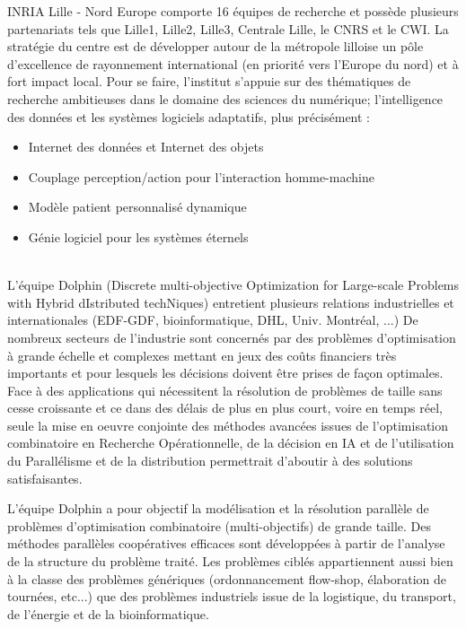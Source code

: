 \documentclass[a4paper,10pt]{report}
\begin{document}
      INRIA Lille - Nord Europe comporte 16 équipes de recherche et possède plusieurs partenariats tels que Lille1, Lille2, Lille3, Centrale Lille, le CNRS et le CWI.
      La stratégie du centre est de développer autour de la métropole lilloise un pôle d'excellence de rayonnement international (en priorité vers l'Europe du nord) et à fort impact local.
      Pour se faire, l'institut s'appuie sur des thématiques de recherche ambitieuses dans le domaine des sciences du numérique; l'intelligence des données et les systèmes logiciels adaptatifs, plus précisément :
      \begin{itemize} 
	\item Internet des données et Internet des objets
	\item Couplage perception/action pour l'interaction homme-machine
	\item Modèle patient personnalisé dynamique
	\item Génie logiciel pour les systèmes éternels
      \end{itemize}
      
      ~~\\
      
      L'équipe Dolphin (Discrete multi-objective Optimization for Large-scale Problems with Hybrid dIstributed techNiques) entretient plusieurs relations industrielles et internationales (EDF-GDF, bioinformatique, DHL, Univ. Montréal, ...)
      De nombreux secteurs de l'industrie sont concernés par des problèmes d'optimisation à grande échelle et complexes mettant en jeux des coûts financiers très importants et pour lesquels les décisions doivent être prises de façon optimales.
      Face à des applications qui nécessitent la résolution de problèmes de taille sans cesse croissante et ce dans des délais de plus en plus court, voire en temps réel, seule la mise en oeuvre conjointe des méthodes avancées issues de l'optimisation combinatoire en Recherche Opérationnelle, de la décision en IA et de l'utilisation du Parallélisme et de la distribution permettrait d'aboutir à des solutions satisfaisantes.

      L'équipe Dolphin a pour objectif la modélisation et la résolution parallèle de problèmes d'optimisation combinatoire (multi-objectifs) de grande taille. Des méthodes parallèles coopératives efficaces sont développées à partir de l'analyse de la structure du problème traité. Les problèmes ciblés appartiennent aussi bien à la classe des problèmes génériques (ordonnancement flow-shop, élaboration de tournées, etc...) que des problèmes industriels issue de la logistique, du transport, de l'énergie et de la bioinformatique.
      
\end{document}
